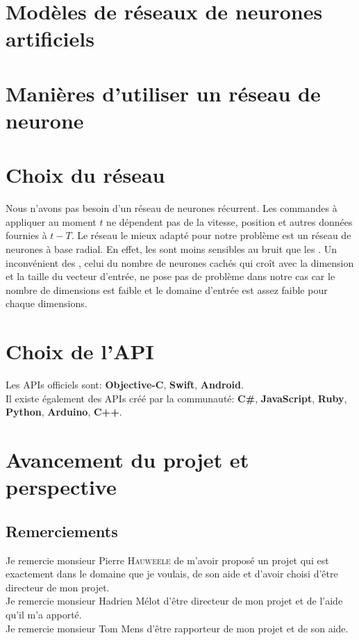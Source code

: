 \documentclass[12pt,a4paper,oneside, titlepage]{article}
\begin{document}


\tableofcontents
\newpage


\section{Modèles de réseaux de neurones artificiels}
\terminologie







\section{Manières d'utiliser un réseau de neurone}

\section{Choix du réseau}
Nous n'avons pas besoin d'un réseau de neurones récurrent. Les commandes à appliquer au moment $t$ ne dépendent pas de la vitesse, position et autres données fournies à $t-T$.
Le réseau le mieux adapté pour notre problème est un réseau de neurones à base radial.
En effet, les \rbf sont moins sensibles au bruit que les \mlp \cite{adversarial,Gauthier}.%
Un inconvénient des \rbf, celui du nombre de neurones cachés qui croît avec la dimension et la taille du vecteur d'entrée, ne pose pas de problème dans notre cas
car le nombre de dimensions est faible
et le domaine d'entrée est assez faible pour chaque dimensions.
\section{Choix de l'API}
Les APIs officiels sont:\cite{SDKofficiels} \textbf{Objective-C}, \textbf{Swift}, \textbf{Android}.\\
Il existe également des APIs créé par la communauté:\cite{gosphero} \textbf{C\#}, \textbf{JavaScript}, \textbf{Ruby}, \textbf{Python}\cite{pythonAPI}, \textbf{Arduino}, \textbf{C++}\cite{cppAPI}.\\
\section{Avancement du projet et perspective}
\subsection*{Remerciements}
\noindent Je remercie monsieur Pierre \textsc{Hauweele} de m'avoir proposé un projet qui est exactement dans le domaine que je voulais, de son aide et d'avoir choisi d'être directeur de mon projet.\\

\noindent Je remercie monsieur Hadrien Mélot d'être directeur de mon projet et de l'aide qu'il m'a apporté.\\

\noindent Je remercie monsieur Tom Mens d'être rapporteur de mon projet et de son aide.\\



\end{document}
